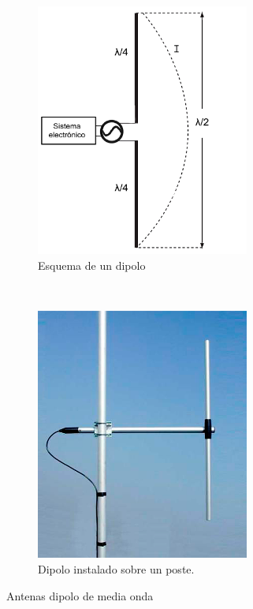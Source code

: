 \begin{figure}[h]
\centering
	\begin{subfigure}[b]{0.4\textwidth} %
		\centering
		\includegraphics[width=7cm]{archivos/dipolo/dipole1} %
		\caption{Esquema de un dipolo}
		\label{fig:dipolo1}
	\end{subfigure}
~ %
	\begin{subfigure}[b]{0.4\textwidth} %
	\centering
		\includegraphics[width=7cm]{archivos/dipolo/dipole2} %
		\caption{Dipolo instalado sobre un poste. \cite{Sirio2012}}
		\label{fig:dipolo2}
	\end{subfigure}
\caption{Antenas dipolo de media onda}\label{fig:dipolo}
\end{figure}

